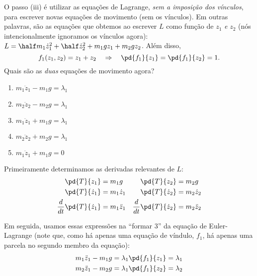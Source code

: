 \begin{question}
  	O passo (iii) é utilizar as equações de Lagrange, \emph{sem a imposição dos vínculos}, para escrever novas equações de movimento (sem os vínculos).
  	Em outras palavras, são as equações que obtemos ao escrever $L$ como função de $z_1$ \emph{e} $z_2$ (nós intencionalmente ignoramos os vínculos agora): $L = \half m_1 \dot z_1^2 + \half \dot z_2^2 + m_1 g z_1 + m_2 g z_2$.
  	Além disso,
  	\begin{equation*}
  		f_1(z_1, z_2) = z_1 + z_2 \quad\Rightarrow\quad \pd{f_1}{z_1} = \pd{f_1}{z_2} = 1.
  	\end{equation*}
  	Quais são as \emph{duas} equações de movimento agora?

  	\begin{enumerate}
  		\item $m_1\ddot z_1 - m_1 g = \lambda_1$ \rightanswer
  		\item $m_2\ddot z_2 - m_2 g = \lambda_1$ \rightanswer
  		\item $m_1\ddot z_1 + m_1 g = \lambda_1$
  		\item $m_2\ddot z_2 + m_2 g = \lambda_1$
  		\item $m_1\ddot z_1 + m_1 g = 0$
  	\end{enumerate}

    \begin{solution}
      Primeiramente determinamos as derivadas relevantes de $L$:
      \begin{align*}
        \pd{T}{z_1} &= m_1g
          & \pd{T}{z_2} &= m_2g \\
        \pd{T}{\dot z_1} &= m_1\dot z_1
          & \pd{T}{\dot z_2} &= m_2\dot z_2\\
        \frac{d}{dt}\pd{T}{\dot z_1} &= m_1\ddot z_1 
          & \frac{d}{dt}\pd{T}{\dot z_2} &= m_2\ddot z_2
      \end{align*}

      Em seguida, usamos essas expressões na ``formar 3'' da equação de Euler-Lagrange (note que, como há apenas uma equação de víndulo, $f_1$, há apenas uma parcela no segundo membro da equação):
      \begin{align*}
        m_1\ddot z_1 - m_1g = \lambda_1 \pd{f_1}{z_1} = \lambda_1 \\
        m_2\ddot z_1 - m_2g = \lambda_1 \pd{f_1}{z_2} = \lambda_2
      \end{align*}
    \end{solution}
\end{question}